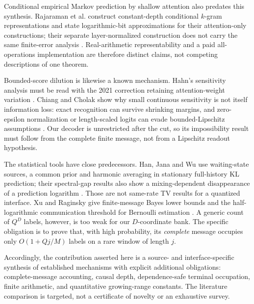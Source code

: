 \documentclass[11pt,letterpaper]{article}
\theoremstyle{definition}\newtheorem{definition}[theorem]{Definition}
\theoremstyle{remark}\newtheorem{remark}[theorem]{Remark}
\begin{document}
Conditional empirical Markov prediction by shallow attention also predates this synthesis. Rajaraman et al. construct constant-depth conditional $k$-gram representations and state logarithmic-bit approximations for their attention-only constructions; their separate layer-normalized construction does not carry the same finite-error analysis \citep[Theorems 4.4 and 5.1; Remarks 4.2 and 5.2]{rajaraman2024}. Real-arithmetic representability and a paid all-operations implementation are therefore distinct claims, not competing descriptions of one theorem.

Bounded-score dilution is likewise a known mechanism. Hahn's sensitivity analysis must be read with the 2021 correction retaining attention-weight variation \citep{hahn2020,hahn2021supp}. Chiang and Cholak show why small continuous sensitivity is not itself information loss: exact recognition can survive shrinking margins, and zero-epsilon normalization or length-scaled logits can evade bounded-Lipschitz assumptions \citep{chiang2022}. Our decoder is unrestricted after the cut, so its impossibility result must follow from the complete finite message, not from a Lipschitz readout hypothesis.

The statistical tools have close predecessors. Han, Jana and Wu use waiting-state sources, a common prior and harmonic averaging in stationary full-history KL prediction; their spectral-gap results also show a mixing-dependent disappearance of a prediction logarithm \citep{han2022}. Those are not same-rate TV results for a quantized interface. Xu and Raginsky give finite-message Bayes lower bounds and the half-logarithmic communication threshold for Bernoulli estimation \citep[Theorem 3 and Example 6]{xu2016}. A generic count of $Q^D$ labels, however, is too weak for our $D$-coordinate bank. The specific obligation is to prove that, with high probability, its \emph{complete} message occupies only $O(1+Qj/M)$ labels on a rare window of length $j$.

Accordingly, the contribution asserted here is a source- and interface-specific synthesis of established mechanisms with explicit additional obligations: complete-message accounting, causal depth, dependence-safe terminal occupation, finite arithmetic, and quantitative growing-range constants. The literature comparison is targeted, not a certificate of novelty or an exhaustive survey.
\end{document}
